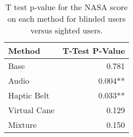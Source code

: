 
\begin{table}[!htb]
\centering
\caption{T test p-value for the NASA score on each method for blinded users versus sighted users.}
\label{tab:ttest_nasa_score}
\begin{tabular}{lr}
\toprule
      Method & T-Test P-Value \\
\midrule
        Base &          0.781 \\
       Audio &        0.004** \\
 Haptic Belt &        0.033** \\
Virtual Cane &          0.129 \\
     Mixture &          0.150 \\
\bottomrule
\end{tabular}
\end{table}

